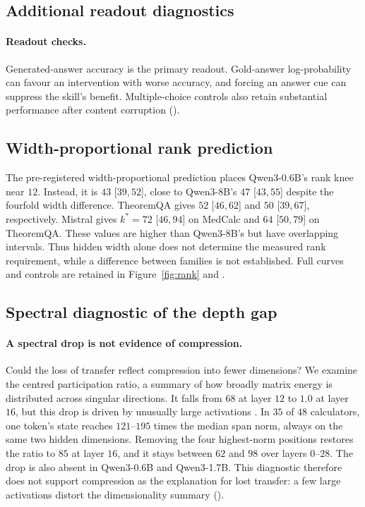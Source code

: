\subsection{Additional readout diagnostics}
\paragraph{Readout checks.}
\label{sec:traps}
Generated-answer accuracy is the primary readout. Gold-answer
log-probability can favour an intervention with worse accuracy, and forcing
an answer cue can suppress the skill's benefit. Multiple-choice controls also
retain substantial performance after content corruption
\citep{balepur2024artifacts} ().

\subsection{Width-proportional rank prediction}
The pre-registered width-proportional prediction places Qwen3-0.6B's rank
knee near $12$. Instead, it is $43$ [$39,52$], close to Qwen3-8B's $47$
[$43,55$] despite the fourfold width difference. TheoremQA gives $52$
[$46,62$] and $50$ [$39,67$], respectively. Mistral gives $k^{*}=72$ [$46,94$] on MedCalc
and $64$ [$50,79$] on TheoremQA. These values are higher than Qwen3-8B's
but have overlapping intervals. Thus hidden width alone does not determine
the measured rank requirement, while a difference between families is not
established. Full curves and controls are retained in Figure~\ref{fig:rank}
and .

\subsection{Spectral diagnostic of the depth gap}
\paragraph{A spectral drop is not evidence of compression.}
Could the loss of transfer reflect compression into fewer dimensions? We
examine the centred participation ratio, a summary of how broadly matrix energy
is distributed across singular directions. It falls from $68$ at layer $12$
to $1.0$ at layer $16$, but this drop is driven by unusually large activations
\citep{sun2024massive, shi2026melayer}. In $35$ of $48$ calculators, one
token's state reaches $121$--$195$ times the median span norm, always on the
same two hidden dimensions. Removing the four highest-norm positions restores
the ratio to $85$ at layer $16$, and it stays between $62$ and $98$ over layers
$0$--$28$. The drop is also absent in Qwen3-0.6B and Qwen3-1.7B.
This diagnostic therefore does not support compression as the explanation
for lost transfer: a few large activations distort the dimensionality summary
().




